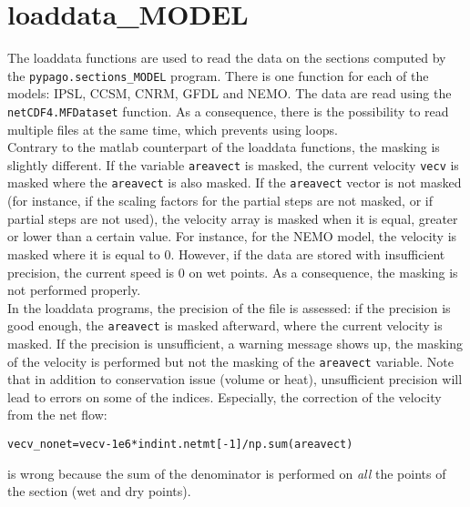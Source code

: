 \section{loaddata\_MODEL}

The loaddata functions are used to read the data on the sections computed by the \verb+pypago.sections_MODEL+ program. There is one function for each of the models: IPSL, CCSM, CNRM, GFDL and NEMO. The data are read using the \verb+netCDF4.MFDataset+ function. As a consequence, there is the possibility to read multiple files at the same time, which prevents using loops.\\

Contrary to the matlab counterpart of the loaddata functions, the masking is slightly different. If the variable \verb+areavect+ is masked, the current velocity \verb+vecv+ is masked where the \verb+areavect+ is also masked. If the \verb+areavect+ vector is not masked (for instance, if the scaling factors for the partial steps are not masked, or if partial steps are not used), the velocity array is masked when it is equal, greater or lower than a certain value. For instance, for the NEMO model, the velocity is masked where it is equal to 0. However, if the data are stored with insufficient precision, the current speed is 0 on wet points. As a consequence, the masking is not performed properly. \\

In the loaddata programs, the precision of the file is assessed: if the precision is good enough, the \verb+areavect+ is masked afterward, where the current velocity is masked. If the precision is unsufficient, a warning message shows up, the masking of the velocity is performed but not the masking of the \verb+areavect+ variable. Note that in addition to conservation issue (volume or heat), unsufficient precision will lead to errors on some of the indices. Especially, the correction of the velocity from the net flow:

\begin{verbatim}
vecv_nonet=vecv-1e6*indint.netmt[-1]/np.sum(areavect)
\end{verbatim}

is wrong because the sum of the denominator is performed on \emph{all} the points of the section (wet and dry points).